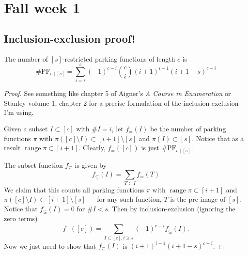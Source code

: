 \section{Fall week 1}

\subsection{Inclusion-exclusion proof!}

\begin{theorem}
	The number of $[s]$-restricted parking functions of length $c$ is
	\[
		\# \mathrm{PF}_{c \mid [s]} = \sum_{i = s}^{c} (-1)^{c - i} \binom{c}{i} (i + 1)^{i - 1} (i + 1 - s)^{c - i}
	\]
\end{theorem}

\begin{proof}
	
See something like chapter 5 of Aigner's \emph{A Course in Enumeration} or Stanley volume 1, chapter 2 for a precise formulation of the inclusion-exclusion I'm using.

Given a subset $I \subset [c]$ with  $\# I = i$, let $f_{=}(I)$ be the number of parking functions $\pi$ with $\pi([c] \setminus I) \subset [i + 1] \setminus [s]$ and $\pi(I) \subset [s]$. Notice that as a result $\operatorname{range} \pi \subset [i + 1]$. Clearly, $f_{=}([c])$ is just $\# \mathrm{PF}_{c \mid [s]}$.

The subset function $f_{\subseteq}$ is given by
\[
	f_{\subseteq}(I) = \sum_{T \subset I} f_{=}(T)
\]
We claim that this counts all parking functions $\pi$ with $\operatorname{range} \pi \subset [i + 1]$ and $\pi([c] \setminus I) \subset [i + 1] \setminus [s]$ --- for any such function, $T$ is the pre-image of $[s]$. Notice that $f_{\subseteq}(I) = 0$ for  $\#I < s$. Then by inclusion-exclusion (ignoring the zero terms)
\[
	f_{=}([c]) = \sum_{I \subset [c], i \ge s} (-1)^{c - i} f_\subseteq (I).
\]
Now we just need to show that $f_{\subseteq}(I)$ is $(i + 1)^{i - 1}(i + 1 - s)^{c - i}$.
\end{proof}
